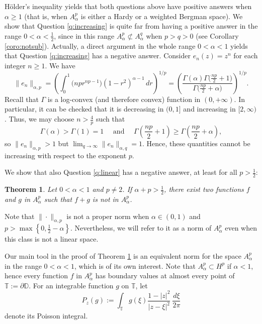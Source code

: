 \documentclass[12pt]{amsart}
\newtheorem{theorem}{Theorem}[section]
\theoremstyle{definition}
\newcommand{\T}{\mathbb{{T}}}
\newcommand{\D}{\mathbb{{D}}}
\numberwithin{equation}{section}
\begin{document}
        Hölder's inequality yields that both questions above have positive answers when $\alpha\ge1$ (that is, when $A^p_\alpha$ is either a Hardy or a weighted Bergman space). We show that Question \ref{q:increasing} is quite far from having a positive answer in the range $0 < \alpha < \frac{1}{2}$, since in this range $A^p_\alpha\not\subset A^q_\alpha$ when $p > q > 0$ (see Corollary \ref{coro:notsub}). Actually, a direct argument in the whole range $0<\alpha<1$ yields that Question \ref{q:increasing} has a negative answer. Consider $e_n(z) = z^n$ for each integer $n \geq 1$. We have
        \[
            \| e_n \|_{\alpha, p} = \left(\int_0^1 \big(np r^{np-1} \big) (1 - r^2)^{\alpha - 1} \, dr \right)^{1/p}  = \left(\frac{\Gamma(\alpha)\Gamma\big(\frac{np}{2} + 1\big)}{\Gamma\big(\frac{np}{2} + \alpha \big)}\right)^{1/p}.
        \]
        Recall that $\Gamma$ is a log-convex (and therefore convex) function in $(0,+\infty)$. In particular, it can be checked that it is decreasing in $(0,1]$ and increasing in $[2, \infty)$. Thus, we may choose $n > \frac{4}{p}$ such that
        \[
            \Gamma(\alpha) > \Gamma(1) = 1 \quad \mbox{ and } \quad \Gamma \left(\frac{np}{2} + 1 \right) \geq \Gamma \left(\frac{np}{2} + \alpha \right),
        \]
        so $\| e_n \|_{\alpha, p} > 1$ but $\lim_{q \to \infty} \| e_n \|_{\alpha, q} = 1$. Hence, these quantities cannot be increasing with respect to the exponent $p$.

        We show that also Question \ref{q:linear} has a negative answer, at least for all $p > \frac{1}{2}$:

        \begin{theorem}
        \label{theo:NonLinear}
            Let $0<\alpha<1$ and $p \neq 2$. If $\alpha + p > \frac{1}{2}$, there exist two functions $f$ and $g$ in $A^p_\alpha$ such that $f+g$ is not in $A^p_\alpha$.
        \end{theorem}

        Note that $\| \cdot \|_{\alpha, p}$ is not a proper norm when $\alpha \in (0,1)$ and $p > \max \left \{ 0, \frac{1}{2} - \alpha \right\}$. Nevertheless, we will refer to it as a norm of $A^p_\alpha$ even when this class is not a linear space.

        Our main tool in the proof of Theorem \ref{theo:NonLinear} is an equivalent norm for the space $A^p_\alpha$ in the range $0<\alpha<1$, which is of its own interest. Note that $A^p_\alpha \subset  H^p$ if $\alpha<1$, hence every function $f$ in $A^p_\alpha$ has boundary values at almost every point of $\T := \partial \D$. For an integrable function $g$ on $\T$, let
            \[
            P_z(g):=\int_\T g(\xi)\frac{1-|z|^2}{|z-\xi|^2}~\frac{d\xi}{2\pi}
            \]
            denote its Poisson integral.
        
\end{document}

